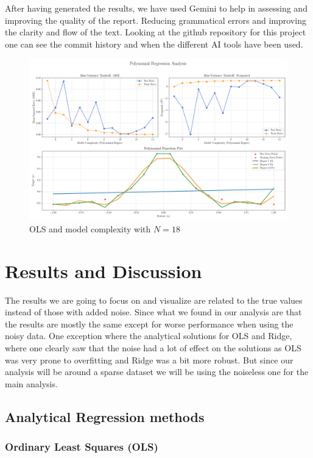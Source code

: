 \documentclass[twocolumn,aps]{revtex4}
\begin{document}
After having generated the results, we have used Gemini to help in assessing and improving the quality of the report.
Reducing grammatical errors and improving the clarity and flow of the text.
Looking at the github repository for this project one can see the commit history and when the different AI tools have been used.
\begin{figure}[t]
    \centering  
    \includegraphics[width=.95 \linewidth]{Figures/Combined_Analysis_OLS.png}
    \caption{OLS and model complexity with $N=18$}
    \label{fig:OLS1}
\end{figure}
\section{Results and Discussion}\label{section:results}
The results we are going to focus on and visualize are related to the true values instead of those with added noise. 
Since what we found in our analysis are that the results are mostly the same except for worse performance when using the noisy data.
One exception where the analytical solutions for OLS and Ridge, where one clearly saw that the noise had a lot of effect on the solutions as OLS was very prone to overfitting and Ridge was a bit more robust.
But since our analysis will be around a sparse dataset we will be using the noiseless one for the main analysis.

\subsection{Analytical Regression methods}

\subsubsection{Ordinary Least Squares (OLS)}
\end{document}
